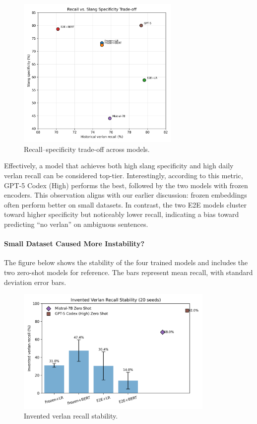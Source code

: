 \documentclass[12pt]{article}
\begin{document}
\begin{figure}[H]
    \centering
    \includegraphics[width=0.7\textwidth]{figures/historical_vs_slang_tradeoff.png}
    \caption{Recall--specificity trade-off across models.}
    \label{fig:tradeoff-scatter}
\end{figure}

Effectively, a model that achieves both high slang specificity and high daily verlan recall can be considered top-tier. 
Interestingly, according to this metric, GPT-5 Codex (High) performs the best, followed by the two models with frozen encoders. 
This observation aligns with our earlier discussion: frozen embeddings often perform better on small datasets. 
In contrast, the two E2E models cluster toward higher specificity but noticeably lower recall, indicating a bias toward predicting ``no verlan'' on ambiguous sentences.

\paragraph{Small Dataset Caused More Instability?}

The figure below shows the stability of the four trained models and includes the two zero-shot models for reference. 
The bars represent mean recall, with standard deviation error bars.

\begin{figure}[H]
    \centering
    \includegraphics[width=0.85\textwidth]{figures/invented_recall_variance.png}
    \caption{Invented verlan recall stability.}
    \label{fig:invented-variance}
\end{figure}
\end{document}
